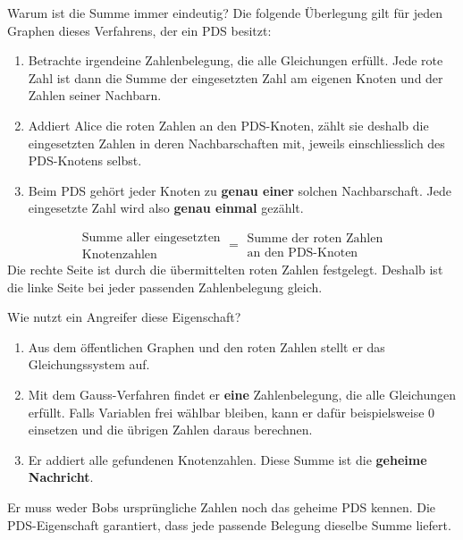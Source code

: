 \begin{frame}{Warum ist die Summe immer eindeutig?}
	\small
	Die folgende Überlegung gilt für jeden Graphen dieses Verfahrens, der ein PDS besitzt:
	\begin{enumerate}
		\item Betrachte irgendeine Zahlenbelegung, die alle Gleichungen erfüllt. Jede rote Zahl ist dann die Summe der eingesetzten Zahl am eigenen Knoten und der Zahlen seiner Nachbarn.
		\item Addiert Alice die roten Zahlen an den PDS-Knoten, zählt sie deshalb die eingesetzten Zahlen in deren Nachbarschaften mit, jeweils einschliesslich des PDS-Knotens selbst.
		\item Beim PDS gehört jeder Knoten zu \textbf{genau einer} solchen Nachbarschaft. Jede eingesetzte Zahl wird also \textbf{genau einmal} gezählt.
	\end{enumerate}
	\[
		\begin{gathered}
			\text{Summe aller eingesetzten}\\
			\text{Knotenzahlen}
		\end{gathered}
		=
		\begin{gathered}
			\text{Summe der roten Zahlen}\\
			\text{an den PDS-Knoten}
		\end{gathered}
	\]
	Die rechte Seite ist durch die übermittelten roten Zahlen festgelegt.
	Deshalb ist die linke Seite bei jeder passenden Zahlenbelegung gleich.
\end{frame}

\begin{frame}{Wie nutzt ein Angreifer diese Eigenschaft?}
	\begin{enumerate}
		\item Aus dem öffentlichen Graphen und den roten Zahlen stellt er das Gleichungssystem auf.
		\item Mit dem Gauss-Verfahren findet er \textbf{eine} Zahlenbelegung, die alle Gleichungen erfüllt. Falls Variablen frei wählbar bleiben, kann er dafür beispielsweise $0$ einsetzen und die übrigen Zahlen daraus berechnen.
		\item Er addiert alle gefundenen Knotenzahlen. Diese Summe ist die \textbf{geheime Nachricht}.
	\end{enumerate}
	\medskip
	Er muss weder Bobs ursprüngliche Zahlen noch das geheime PDS kennen.
	Die PDS-Eigenschaft garantiert, dass jede passende Belegung dieselbe Summe liefert.
\end{frame}

